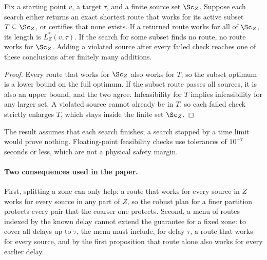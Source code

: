 \begin{proposition}
Fix a starting point $v$, a target $\tau$, and a finite source set $\Sc_Z$. Suppose each search either returns an exact shortest route that works for its active subset $T\subseteq\Sc_Z$, or certifies that none exists. If a returned route works for all of $\Sc_Z$, its length is $L_Z^*(v,\tau)$. If the search for some subset finds no route, no route works for $\Sc_Z$. Adding a violated source after every failed check reaches one of these conclusions after finitely many additions.
\end{proposition}
\begin{proof}
Every route that works for $\Sc_Z$ also works for $T$, so the subset optimum is a lower bound on the full optimum. If the subset route passes all sources, it is also an upper bound, and the two agree. Infeasibility for $T$ implies infeasibility for any larger set. A violated source cannot already be in $T$, so each failed check strictly enlarges $T$, which stays inside the finite set $\Sc_Z$.
\end{proof}
The result assumes that each search finishes; a search stopped by a time limit would prove nothing. Floating-point feasibility checks use tolerances of $10^{-7}$ seconds or less, which are not a physical safety margin.

\paragraph{Two consequences used in the paper.}
First, splitting a zone can only help: a route that works for every source in $Z$ works for every source in any part of $Z$, so the robust plan for a finer partition protects every pair that the coarser one protects. Second, a menu of routes indexed by the known delay cannot extend the guarantee for a fixed zone: to cover all delays up to $\tau$, the menu must include, for delay $\tau$, a route that works for every source, and by the first proposition that route alone also works for every earlier delay.

